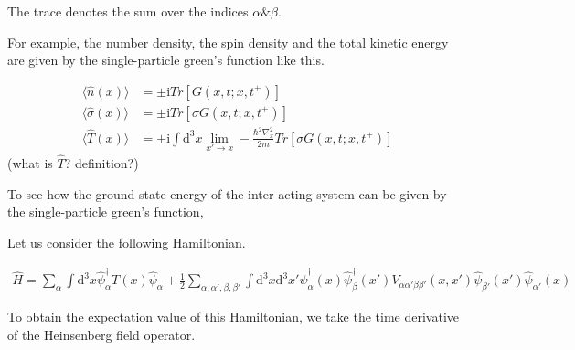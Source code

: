 ﻿\documentclass[twoside]{book}
\numberwithin{equation}{section}
\begin{document}
The trace denotes the sum over the indices $\alpha \& \beta$.

For example, the number density, the spin density and the total kinetic energy are given by the single-particle green's function like this.

\begin{align}
\langle\hat{n}(x)\rangle&=\pm\mathrm{i}Tr[G(x,t;x,t^+)] \nonumber \\
\langle\hat{\sigma}(x)\rangle&=\pm\mathrm{i}Tr[\sigma G(x,t;x,t^+)] \nonumber \\
\langle\hat{T}(x)\rangle&=\pm\mathrm{i}\int \mathrm{d}^3x \lim_{x'\rightarrow x}-\frac{\hbar^2\nabla^2_x}{2m}Tr[\sigma G(x,t;x,t^+)]  \nonumber
\end{align}
(what is $\hat T$? definition?)

To see how the ground  state energy  of the inter acting system can be given by the single-particle green's function,

Let us consider the following Hamiltonian.

\begin{align}\label{2.3.3}
\hat H=\sum_{\alpha}\int \mathrm{d}^3x \hat \psi^{\dagger}_{\alpha}T(x)\hat \psi_{\alpha}+\frac{1}{2}\sum_{\alpha,\alpha',\beta,\beta'}\int \mathrm{d}^3x\mathrm{d}^3x'\hat \psi^{\dagger}_{\alpha}(x)\hat \psi^{\dagger}_{\beta}(x')V_{\alpha\alpha'\beta\beta'}(x,x')\hat \psi_{\beta'}(x')\hat \psi_{\alpha'}(x) 
\end{align}

To obtain the expectation value of this Hamiltonian, we take the time derivative of the Heinsenberg field operator.
\end{document}
